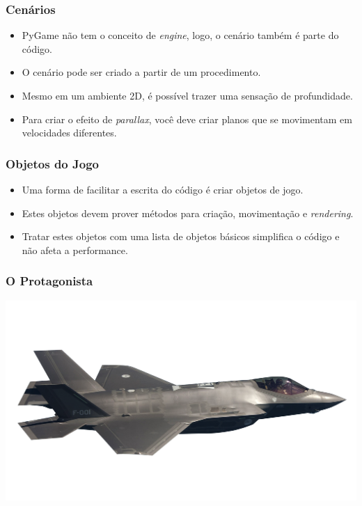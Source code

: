 \begin{frame}
    \frametitle{Cenários}

    \begin{itemize}
        \item PyGame não tem o conceito de \textit{engine}, logo, o cenário
        também é parte do código.
        \item O cenário pode ser criado a partir de um procedimento.
        \item Mesmo em um ambiente 2D, é possível trazer uma sensação de
        profundidade.
        \item Para criar o efeito de \textit{parallax}, você deve criar planos
        que se movimentam em velocidades diferentes.
    \end{itemize}
\end{frame}

\begin{frame}
    \frametitle{Objetos do Jogo}

    \begin{itemize}
        \item Uma forma de facilitar a escrita do código é criar objetos de jogo.
        \item Estes objetos devem prover métodos para criação, movimentação e
        \textit{rendering}.
        \item Tratar estes objetos com uma lista de objetos básicos simplifica
        o código e não afeta a performance.
    \end{itemize}
\end{frame}

\begin{frame}
    \frametitle{O Protagonista}

    \centering
    \includegraphics[height=0.7\paperheight]{code/media/images/f18-big.png}
\end{frame}

